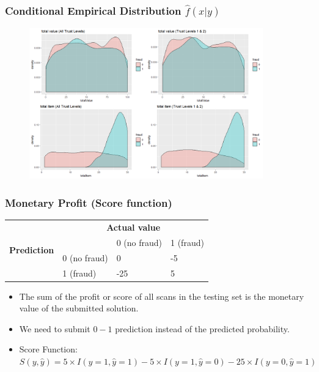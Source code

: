 \documentclass{beamer}
\begin{document}
\begin{frame}
\frametitle{Conditional Empirical Distribution $\hat{f}(x|y)$}
\begin{figure}[H]
		\centering
		\includegraphics[width = 0.9\textwidth]{figure/DATA_P5.png}
	\end{figure}
\end{frame}

\begin{frame}
 \frametitle{Monetary Profit (Score function)}  
\begin{table}[ht]
\begin{tabular}{|c|l|l|l|}
    \hline
    \multirow{4}{*}{\textbf{Prediction}} & \multicolumn{3}{|c|}{\textbf{Actual value}}\\ \cline{2-4}
    &  & 0 (no fraud) & 1 (fraud)\\ \cline{2-4}
    & 0 (no fraud) & 0 & -5\\ \cline{2-4}
    & 1 (fraud) & -25 & 5\\ \hline
\end{tabular}
\end{table}

\begin{itemize}
\item The sum of the profit or score of all scans in the testing set is the monetary value of the submitted solution.
\item We need to submit $0-1$ prediction instead of the predicted probability.
\item Score Function: \\
$S(y,\hat{y})=5 \times I(y=1,\hat{y}=1) - 5 \times I(y=1,\hat{y}=0) - 25 \times I(y=0,\hat{y}=1)$
\end{itemize}
\end{frame}
\end{document}
